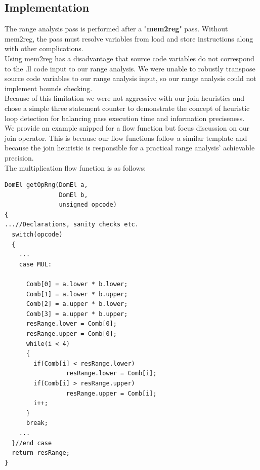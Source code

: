 \subsection{Implementation}
The range analysis pass is performed after a "\textbf{mem2reg}" pass. Without mem2reg, the pass must resolve variables from load and store instructions along with other complications.\\
Using mem2reg has a disadvantage that source code variables do not correspond to the .ll code input to our range analysis. We were unable to robustly transpose source code variables to our range analysis input, so our range analysis could not implement bounds checking.\\
Because of this limitation we were not aggressive with our join heuristics and chose a simple three statement counter to demonstrate the concept of heuristic loop detection for balancing pass execution time and information preciseness.\\
We provide an example snipped  for a flow function but focus discussion on our join operator. This is because our flow functions follow a similar template and because the join heuristic is responsible for a practical range analysis' achievable precision.\\
The multiplication flow function is as follows:

\begin{lstlisting}[caption=Range analysis flow functions, label=PAFF]
DomEl getOpRng(DomEl a, 
               DomEl b, 
               unsigned opcode)
{
...//Declarations, sanity checks etc.
  switch(opcode) 
  {
  	...
    case MUL:

      Comb[0] = a.lower * b.lower;
      Comb[1] = a.lower * b.upper;
      Comb[2] = a.upper * b.lower;
      Comb[3] = a.upper * b.upper;
      resRange.lower = Comb[0];
      resRange.upper = Comb[0];
      while(i < 4)
      {
        if(Comb[i] < resRange.lower)
    	         resRange.lower = Comb[i];
        if(Comb[i] > resRange.upper)
    	         resRange.upper = Comb[i];
        i++;
      }
      break;
    ...
  }//end case
  return resRange;
}
\end{lstlisting}

